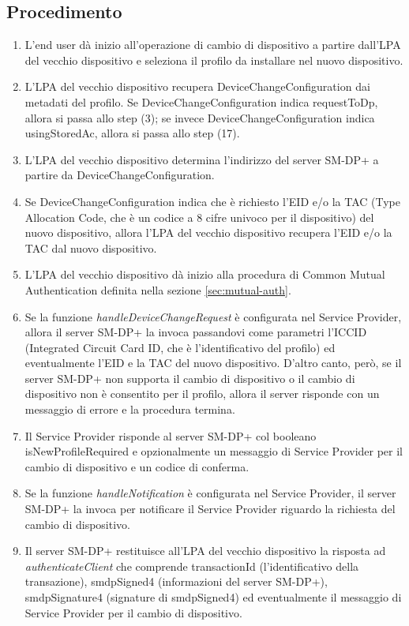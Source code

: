 \documentclass[10pt, twoside, openany]{book}
\begin{document}
\subsection{Procedimento}
\begin{enumerate}
\item L'end user dà inizio all'operazione di cambio di dispositivo a partire dall'LPA del vecchio dispositivo e seleziona il profilo da installare nel nuovo dispositivo.
\item L'LPA del vecchio dispositivo recupera DeviceChangeConfiguration dai metadati del profilo. Se DeviceChangeConfiguration indica requestToDp, allora si passa allo step (3); se invece DeviceChangeConfiguration indica usingStoredAc, allora si passa allo step (17).
\item L'LPA del vecchio dispositivo determina l'indirizzo del server SM-DP+ a partire da DeviceChangeConfiguration.
\item Se DeviceChangeConfiguration indica che è richiesto l'EID e/o la TAC (Type Allocation Code, che è un codice a 8 cifre univoco per il dispositivo) del nuovo dispositivo, allora l'LPA del vecchio dispositivo recupera l'EID e/o la TAC dal nuovo dispositivo.
\item L'LPA del vecchio dispositivo dà inizio alla procedura di Common Mutual Authentication definita nella sezione \ref{sec:mutual-auth}.
\item Se la funzione \textit{handleDeviceChangeRequest} è configurata nel Service Provider, allora il server SM-DP+ la invoca passandovi come parametri l'ICCID (Integrated Circuit Card ID, che è l'identificativo del profilo) ed eventualmente l'EID e la TAC del nuovo dispositivo. D'altro canto, però, se il server SM-DP+ non supporta il cambio di dispositivo o il cambio di dispositivo non è consentito per il profilo, allora il server risponde con un messaggio di errore e la procedura termina.
\item Il Service Provider risponde al server SM-DP+ col booleano isNewProfileRequired e opzionalmente un messaggio di Service Provider per il cambio di dispositivo e un codice di conferma.
\item Se la funzione \textit{handleNotification} è configurata nel Service Provider, il server SM-DP+ la invoca per notificare il Service Provider riguardo la richiesta del cambio di dispositivo.
\item Il server SM-DP+ restituisce all'LPA del vecchio dispositivo la risposta ad \textit{authenticateClient} che comprende transactionId (l'identificativo della transazione), smdpSigned4 (informazioni del server SM-DP+), smdpSignature4 (signature di smdpSigned4) ed eventualmente il messaggio di Service Provider per il cambio di dispositivo.

\end{enumerate}
\end{document}

